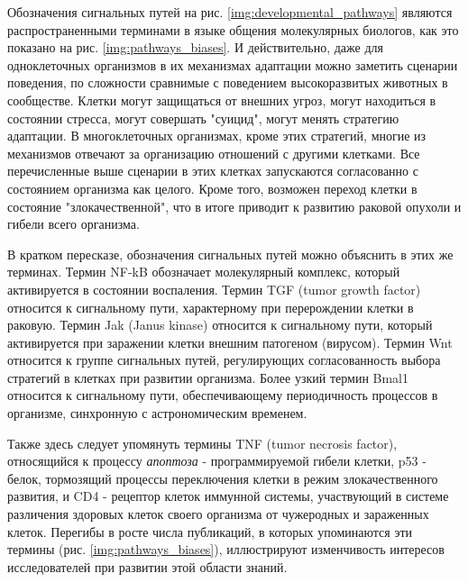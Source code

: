 Обозначения сигнальных путей на рис. \ref{img:developmental_pathways} являются распространенными терминами в языке общения молекулярных биологов, как это показано на рис. \ref{img:pathways_biases}. И действительно, даже для одноклеточных организмов в их механизмах адаптации можно заметить сценарии поведения, по сложности сравнимые с поведением высокоразвитых животных в сообществе. Клетки могут защищаться от внешних угроз, могут находиться в состоянии стресса, могут совершать "суицид", могут менять стратегию адаптации. В многоклеточных организмах, кроме этих стратегий, многие из механизмов отвечают за организацию отношений с другими клетками. Все перечисленные выше сценарии в этих клетках запускаются согласованно с состоянием организма как целого. Кроме того, возможен переход клетки в состояние "злокачественной", что в итоге приводит к развитию раковой опухоли и гибели всего организма.

В кратком пересказе, обозначения сигнальных путей можно объяснить в этих же терминах. Термин NF-kB обозначает молекулярный комплекс, который активируется в состоянии воспаления. Термин TGF (tumor growth factor) относится к сигнальному пути, характерному при перерождении клетки в раковую. Термин Jak (Janus kinase) относится к сигнальному пути, который активируется при заражении клетки внешним патогеном (вирусом). Термин Wnt относится к группе сигнальных путей, регулирующих согласованность выбора стратегий в клетках при развитии организма. Более узкий термин Bmal1 относится к сигнальному пути, обеспечивающему периодичность процессов в организме, синхронную с астрономическим временем. 

Также здесь следует упомянуть термины TNF (tumor necrosis factor), относящийся к процессу \textit{апоптоза} - программируемой гибели клетки, p53 - белок, тормозящий процессы переключения клетки в режим злокачественного развития, и CD4 - рецептор клеток иммунной системы, участвующий в системе различения здоровых клеток своего организма от чужеродных и зараженных клеток. Перегибы в росте числа публикаций, в которых упоминаются эти термины (рис. \ref{img:pathways_biases}), иллюстрируют изменчивость интересов исследователей при развитии этой области знаний.


